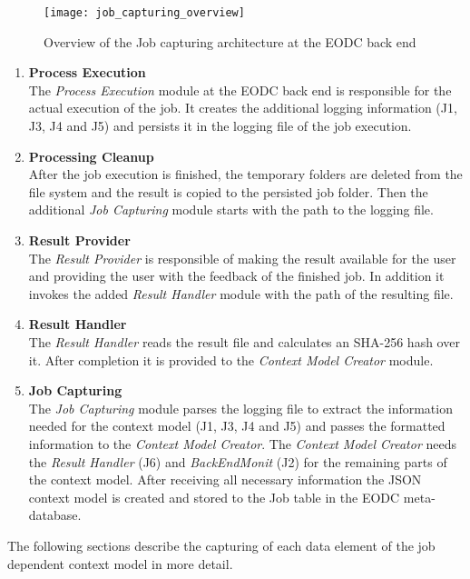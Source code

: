 \documentclass[draft,final]{vutinfth} %
\begin{document}
\begin{figure}[h]
	\centering
	\texttt{[image: job\_capturing\_overview]}
	\caption{Overview of the Job capturing architecture at the EODC back end}
	\label{fig:impljobcapture} %
\end{figure}

\begin{enumerate}
	\item \textbf{Process Execution} \\
	The \textit{Process Execution} module at the EODC back end is responsible for the actual execution of the job. It creates the additional logging information (J1, J3, J4 and J5) and persists it in the logging file of the job execution. 
	\item \textbf{Processing Cleanup} \\
	After the job execution is finished, the temporary folders are deleted from the file system and the result is copied to the persisted job folder. Then the additional \textit{Job Capturing} module starts with the path to the logging file.  
	\item \textbf{Result Provider} \\
	The \textit{Result Provider} is responsible of making the result available for the user and providing the user with the feedback of the finished job. In addition it invokes the added \textit{Result Handler} module with the path of the resulting file.
	\item \textbf{Result Handler} \\
	The \textit{Result Handler} reads the result file and calculates an SHA-256 hash over it. After completion it is provided to the \textit{Context Model Creator} module.  
	\item \textbf{Job Capturing} \\
	The \textit{Job Capturing} module parses the logging file to extract the information needed for the context model (J1, J3, J4 and J5) and passes the formatted information to the \textit{Context Model Creator}. The \textit{Context Model Creator} needs the \textit{Result Handler} (J6) and \textit{BackEndMonit} (J2) for the remaining parts of the context model. After receiving all necessary information the JSON context model is created and stored to the Job table in the EODC meta-database.    
\end{enumerate}

The following sections describe the capturing of each data element of the job dependent context model in more detail.
\end{document}
